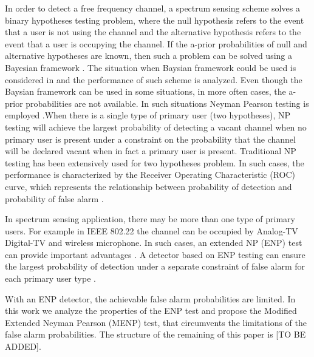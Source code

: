 \documentclass{report}
\begin{document}
\begin{spacing}{2.0}
In order to detect a free frequency channel, a spectrum sensing scheme solves a binary hypotheses testing problem, where the null hypothesis refers to the event that a user is not using the channel and the alternative hypothesis refers to the event that a user is occupying the channel. If the a-prior probabilities of null and alternative hypotheses are known, then such a problem can be solved using a Bayesian framework \cite{poor1994introduction}. The situation when Baysian framework could be used is considered in \cite{zeng2010review} and the performance of such scheme is analyzed.
Even though the Baysian framework can be used in some situations, in more often cases, the a-prior probabilities are not available. In such situations Neyman Pearson testing is employed \cite{poor1994introduction}.When there is a single type of primary user (two hypotheses), NP testing will achieve the largest probability of detecting a vacant channel when no primary user is present under a constraint on the probability that the channel will be declared vacant when in fact a primary user is present.
Traditional NP testing has been extensively used for two hypotheses problem. In such cases,  the performance is characterized by the Receiver Operating Characteristic (ROC) curve, which represents the relationship between probability of detection and probability of false alarm \cite{poor1994introduction}. 

In spectrum sensing application, there may be more than one type of primary users. For example in IEEE 802.22 \cite{shellhammer2008spectrum} the channel can be occupied by Analog-TV Digital-TV and wireless microphone. In such cases, an extended NP (ENP) test can provide important advantages \cite{zhang1999design}. A detector based on ENP testing can ensure the largest probability of detection under a separate constraint of false alarm for each primary user type \cite{LehmannTest}.

With an ENP detector, the achievable false alarm probabilities are limited. In this work we analyze the properties of the ENP test and propose the Modified Extended Neyman Pearson (MENP) test, that circumvents the limitations of the false alarm probabilities. The structure of the remaining of this paper is [TO BE ADDED].

\newpage
\end{spacing}
\end{document}
